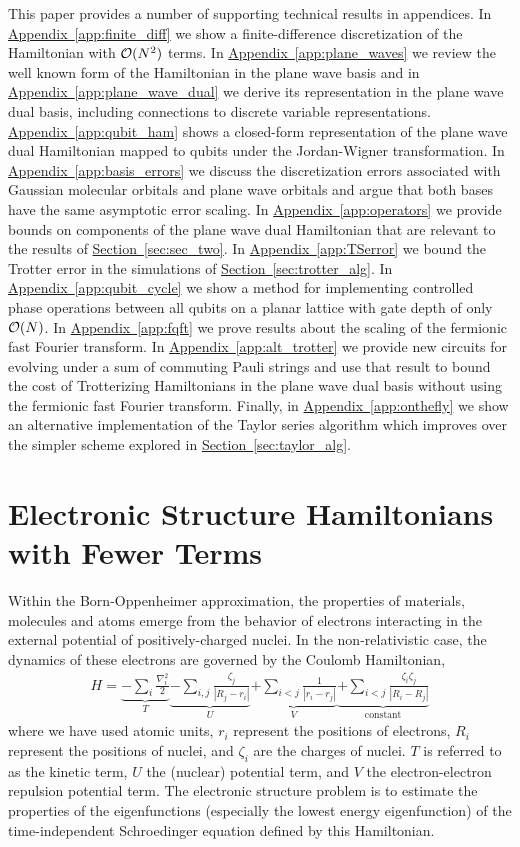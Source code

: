 \documentclass[superscriptaddress,aps,pra,nofootinbib,notitlepage,10pt,longbibliography]{revtex4-1}
\renewcommand{\sec}[1]{\hyperref[sec:#1]{Section~\ref*{sec:#1}}}
\DeclareRobustCommand{\app}[1]{\hyperref[app:#1]{Appendix~\ref*{app:#1}}}
\begin{document}
This paper provides a number of supporting technical results in appendices. In \app{finite_diff} we show a finite-difference discretization of the Hamiltonian with ${\cal O}(N^2)$ terms. In \app{plane_waves} we review the well known form of the Hamiltonian in the plane wave basis and in \app{plane_wave_dual} we derive its representation in the plane wave dual basis, including connections
to discrete variable representations. \app{qubit_ham} shows a closed-form representation of the plane wave dual Hamiltonian mapped to qubits under the Jordan-Wigner transformation. In \app{basis_errors} we discuss the discretization errors associated with Gaussian molecular orbitals and plane wave orbitals and argue that both bases have the same asymptotic error scaling. In \app{operators} we provide bounds on components of the plane wave dual Hamiltonian that are relevant to the results of \sec{sec_two}. In \app{TSerror} we bound the Trotter error in the simulations of \sec{trotter_alg}. In \app{qubit_cycle} we show a method for implementing controlled phase operations between all qubits on a planar lattice with gate depth of only ${\cal O}(N)$. In \app{fqft} we prove results about the scaling of the fermionic fast Fourier transform. In \app{alt_trotter} we provide new circuits for evolving under a sum of commuting Pauli strings and use that result to bound the cost of Trotterizing Hamiltonians in the plane wave dual basis without using the fermionic fast Fourier transform. Finally, in \app{onthefly} we show an alternative implementation of the Taylor series algorithm which improves over the simpler scheme explored in \sec{taylor_alg}.



\section{Electronic Structure Hamiltonians with Fewer Terms}
\label{sec:sec_one}

Within the Born-Oppenheimer approximation, the properties of materials, molecules and atoms emerge from the behavior of electrons interacting in the external potential of positively-charged nuclei. In the non-relativistic case, the dynamics of these electrons are governed by the Coulomb Hamiltonian,
\begin{align}
H = \underbrace{-\sum_i \frac{\nabla^2_i}{2}}_{T} \underbrace{- \sum_{i, j}\frac{\zeta_j}{|R_j - r_i|}}_{U} \underbrace{+ \sum_{i < j} \frac{1}{|r_i - r_j|}}_{V} \underbrace{+ \sum_{i < j}\frac{\zeta_i \zeta_j}{|R_i - R_j|}}_{\textrm{constant}}
\end{align}
where we have used atomic units, $r_i$ represent the positions of electrons, $R_i$ represent the positions of nuclei, and $\zeta_i$ are the charges of nuclei. $T$ is referred to as the kinetic term, $U$ the (nuclear) potential term, and $V$ the electron-electron repulsion potential term. The electronic structure problem is to estimate the properties of the eigenfunctions (especially the lowest energy eigenfunction) of the time-independent Schroedinger equation defined by this Hamiltonian.
\end{document}
